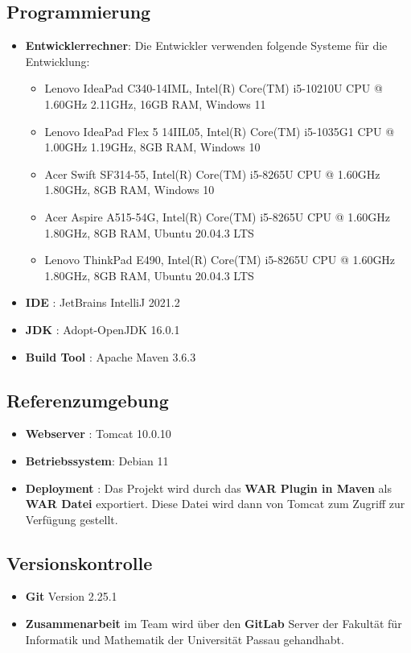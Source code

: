 \subsection{Programmierung}
\begin{itemize}
	\item \textbf{Entwicklerrechner}: Die Entwickler verwenden folgende Systeme für die Entwicklung:
		\begin{itemize}
			\item Lenovo IdeaPad C340-14IML, Intel(R) Core(TM) i5-10210U CPU @ 1.60GHz 2.11GHz, 16GB RAM, Windows 11
			\item Lenovo IdeaPad Flex 5 14IIL05, Intel(R) Core(TM) i5-1035G1 CPU @ 1.00GHz 1.19GHz, 8GB RAM, Windows 10
			\item Acer Swift SF314-55, Intel(R) Core(TM) i5-8265U CPU @ 1.60GHz 1.80GHz, 8GB RAM, Windows 10
			\item Acer Aspire A515-54G, Intel(R) Core(TM) i5-8265U CPU @ 1.60GHz 1.80GHz, 8GB RAM, Ubuntu 20.04.3 LTS
			\item Lenovo ThinkPad E490, Intel(R) Core(TM) i5-8265U CPU @ 1.60GHz 1.80GHz, 8GB RAM, Ubuntu 20.04.3 LTS
		\end{itemize}
	\item \textbf{IDE }: JetBrains IntelliJ 2021.2
	\item \textbf{JDK }: Adopt-OpenJDK 16.0.1
	\item \textbf{Build Tool }: Apache Maven 3.6.3
\end{itemize}
\subsection{Referenzumgebung}
\begin{itemize}
	\item \textbf{Webserver }: Tomcat 10.0.10
	\item \textbf{Betriebssystem}: Debian 11
	\item \textbf{Deployment }: Das Projekt wird durch das \textbf{WAR Plugin in Maven} als \textbf{WAR Datei } exportiert. Diese Datei wird dann von Tomcat zum Zugriff zur Verfügung gestellt.
\end{itemize}
\subsection{Versionskontrolle}
\begin{itemize}
	\item \textbf{Git} Version 2.25.1
	\item \textbf{Zusammenarbeit} im Team wird über den \textbf{GitLab } Server der Fakultät für Informatik und Mathematik der Universität Passau gehandhabt.
\end{itemize}
